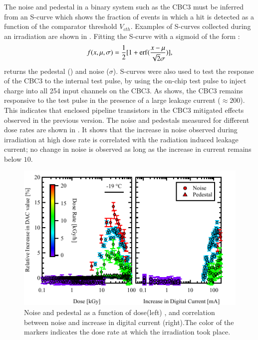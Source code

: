 The noise and pedestal in a binary system such as the CBC3 must be inferred from an S-curve which shows the fraction of events in which a hit is detected as a function of the comparator threshold $V_{cth}$. Examples of S-curves collected during an irradiation are shown in . Fitting the S-curve with a sigmoid of the form :
\begin{equation}
f(x, \mu, \sigma) =\frac{1}{2}[1 + \operatorname{erf}(\frac{x-\mu}{\sqrt{2}\sigma}) ],
\label{eq:scurve}
\end{equation}
returns the  pedestal (\textmu) and noise ($\sigma$). S-curves were also used to test the response of the CBC3 to the internal test pulse, by using the on-chip test pulse to inject charge into all 254 input channels on the CBC3. 
As  shows, the CBC3 remains responsive to the test pulse in the presence of a large leakage current (${\approx 200}$\mA). This indicates that enclosed pipeline transistors in the CBC3 mitigated effects observed in the previous version. The noise and pedestals measured for different dose rates are shown in . It shows that the increase in noise observed during irradiation at high dose rate is correlated with the radiation induced leakage current; no change in noise is observed as long as the increase in current remains below ${10}$\mA.


\begin{figure}[!htbp]
\centering
\includegraphics[width=0.9\linewidth]{Figures/NoisePede_Summary.pdf}
\vspace*{-2mm}
\caption{Noise and pedestal as a function of dose(left) , and correlation between noise and increase in digital current (right).The color of the markers indicates the dose rate at which the irradiation took place.}
\label{fig:noisePede}
\end{figure}



